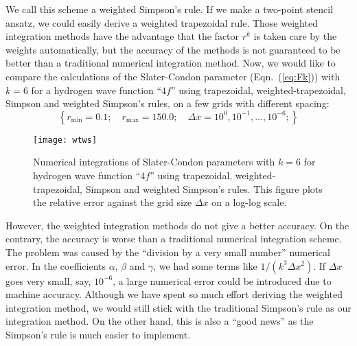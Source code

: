 %
We call this scheme a weighted Simpson's rule. If we make a two-point stencil
ansatz, we could easily derive a weighted trapezoidal rule.
Those weighted integration methods have the advantage that the factor $r^k$
is taken care by the weights automatically, but the accuracy of the methods is
not guaranteed to be better than a traditional numerical integration method.
Now, we would like to compare the calculations of the Slater-Condon parameter
(Eqn.~(\ref{eq:Fk})) with $k=6$ for a hydrogen wave function ``$4f$'' using trapezoidal,
weighted-trapezoidal, Simpson and weighted Simpson's rules, on a few grids
with different spacing:
\begin{equation}
\left\{ r_{\text{min}} = 0.1;\quad r_{\text{max}} = 150.0;\quad \Delta x = 10^0,10^{-1},\ldots,10^{-6}; \right\}
\end{equation}

\begin{figure}[h!]
\centering
  \texttt{[image: wtws]}
  \caption{Numerical integrations of Slater-Condon parameters with $k=6$ for hydrogen wave
  function ``$4f$'' using trapezoidal, weighted-trapezoidal, Simpson and weighted Simpson's rules.
  This figure plots the relative error against the grid size $\Delta x$ on a log-log scale.}
  \label{fig:wtws}
\end{figure}

However, the weighted integration methods do not give a better accuracy. On the contrary,
the accuracy is worse than a traditional numerical integration scheme. The problem was caused
by the ``division by a very small number'' numerical error. In the coefficients $\alpha$, $\beta$
and $\gamma$, we had some terms like $1/(k^3\Delta x^2)$. If $\Delta x$ goes very small, say,
$10^{-6}$, a large numerical error could be introduced due to machine accuracy.
Although we have spent so much effort deriving the weighted integration method, we would still
stick with the traditional Simpson's rule as our integration method. On the other hand, this
is also a ``good news'' as the Simpson's rule is much easier to implement.

